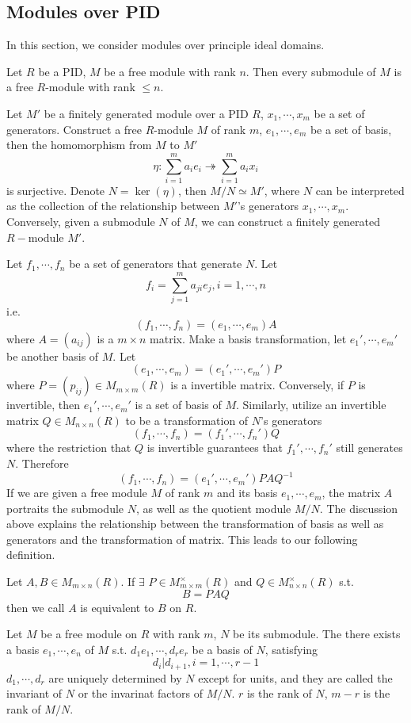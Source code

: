 \subsection{Modules over PID}
In this section, we consider modules over principle ideal domains.\par
\begin{lemma}
Let $R$ be a PID, $M$ be a free module with rank $n$. Then every submodule of $M$ is a free $R$-module with rank $\le n$.
\end{lemma}
Let $M'$ be a finitely generated module over a PID $R$, $x_1,\cdots,x_m$ be a set of generators. Construct a free $R$-module $M$ of rank $m$, $e_1,\cdots,e_m$ be a set of basis, then the homomorphism from $M$ to $M'$
\[\eta : \sum_{i=1}^ma_ie_i\twoheadrightarrow \sum_{i=1}^ma_ix_i\]
is surjective. Denote $N=\ker (\eta)$, then $M/N\simeq M'$, where $N$ can be interpreted as the collection of the relationship between $M'$'s generators $x_1,\cdots,x_m$. Conversely, given a submodule $N$ of $M$, we can construct a finitely generated $R-$module $M'$. \par
Let $f_1,\cdots,f_n$ be a set of generators that generate $N$. Let 
\[f_i=\sum_{j=1}^ma_{ji}e_j,i=1,\cdots,n\]
i.e.\[(f_1,\cdots,f_n)=(e_1,\cdots,e_m)A\]
where $A=(a_{ij})$ is a $m\times n$ matrix. Make a basis transformation, let $e_1',\cdots,e_m'$ be another basis of $M$. Let
\[(e_1,\cdots,e_m)=(e_1',\cdots,e_m')P\]where $P=(p_{ij})\in M_{m\times m}(R)$ is a invertible matrix. Conversely, if $P$ is invertible, then $e_1',\cdots,e_m'$ is a set of basis of $M$. Similarly, utilize an invertible matrix $Q\in M_{n\times n}(R)$ to be a transformation of $N$'s generators\[(f_1,\cdots,f_n)=(f_1',\cdots,f_n')Q\]
where the restriction that $Q$ is invertible guarantees that $f_1',\cdots,f_n'$ still generates $N$. Therefore\[(f_1,\cdots,f_n)=(e_1',\cdots,e_m')PAQ^{-1}\]
If we are given a free module $M$ of rank $m$ and its basis $e_1,\cdots,e_m$, the matrix $A$ portraits the submodule $N$, as well as the quotient module $M/N$. The discussion above explains the relationship between the transformation of basis as well as generators and the transformation of matrix. This leads to our following definition.
\begin{definition}
Let $A,B\in M_{m\times n}(R)$. If $\exists$ $P\in M_{m\times m}^{\times}(R)$ and $Q\in M_{n\times n}^{\times}(R)$ s.t. \[B=PAQ\] then we call $A$ is equivalent to $B$ on $R$.
\end{definition}
\begin{theorem}
Let $M$ be a free module on $R$ with rank $m$, $N$ be its submodule. The there exists a basis $e_1,\cdots,e_n$ of $M$ s.t. $d_1e_1,\cdots,d_re_r$ be a basis of $N$, satisfying \[d_i|d_{i+1},i=1,\cdots,r-1\]$d_1,\cdots,d_r$ are uniquely determined by $N$ except for units, and they are called the invariant of $N$ or the invarinat factors of $M/N$. $r$ is the rank of $N$, $m-r$ is the rank of $M/N$.
\end{theorem}
